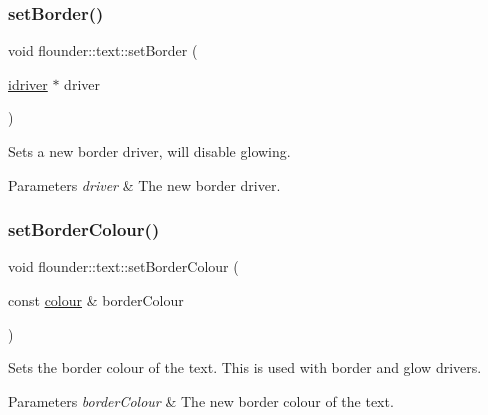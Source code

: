 \mbox{\label{classflounder_1_1text_abe7f908c5a19f4994555ceb18e6acd01}} 
\subsubsection{\texorpdfstring{set\+Border()}{setBorder()}}
{\footnotesize\ttfamily void flounder\+::text\+::set\+Border (\begin{DoxyParamCaption}\item[{\hyperlink{classflounder_1_1idriver}{idriver} $\ast$}]{driver }\end{DoxyParamCaption})}



Sets a new border driver, will disable glowing. 


\begin{DoxyParams}{Parameters}
{\em driver} & The new border driver. \\
\hline
\end{DoxyParams}
\mbox{\label{classflounder_1_1text_a6ea3ea5312d5873c1a64cd9b3efc8deb}} 
\subsubsection{\texorpdfstring{set\+Border\+Colour()}{setBorderColour()}}
{\footnotesize\ttfamily void flounder\+::text\+::set\+Border\+Colour (\begin{DoxyParamCaption}\item[{const \hyperlink{classflounder_1_1colour}{colour} \&}]{border\+Colour }\end{DoxyParamCaption})\hspace{0.3cm}{\ttfamily [inline]}}



Sets the border colour of the text. This is used with border and glow drivers. 


\begin{DoxyParams}{Parameters}
{\em border\+Colour} & The new border colour of the text. \\
\hline
\end{DoxyParams}
\mbox{\label{classflounder_1_1text_a09b4a646005f50e7b73e6eed5b0492ad}} 
